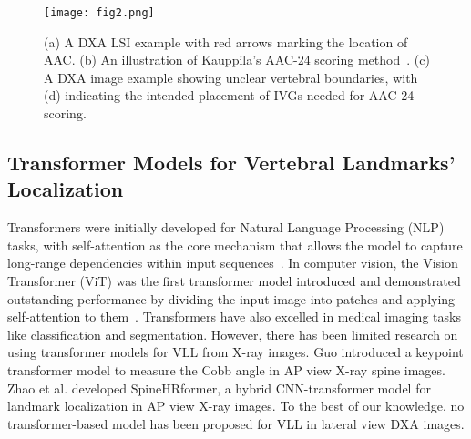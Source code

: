 \begin{figure}[t]
\centerline{\texttt{[image: fig2.png]}}
\caption{(a) A DXA LSI example with red arrows marking the location of AAC. (b) An illustration of Kauppila's AAC-24 scoring method~\cite{kauppila}. (c) A DXA image example showing unclear vertebral boundaries, with (d) indicating the intended placement of IVGs needed for AAC-24 scoring.}
\label{fig2}
\end{figure}

\subsection{Transformer Models for Vertebral Landmarks' Localization}
Transformers were initially developed for Natural Language Processing (NLP) tasks, with self-attention as the core mechanism that allows the model to capture long-range dependencies within input sequences~\cite{attention}. In computer vision, the Vision Transformer (ViT) was the first transformer model introduced and demonstrated outstanding performance by dividing the input image into patches and applying self-attention to them~\cite{vit}. Transformers have also excelled in medical imaging tasks like classification and segmentation. However, there has been limited research on using transformer models for VLL from X-ray images. Guo \cite{guo} introduced a keypoint transformer model to measure the Cobb angle in AP view X-ray spine images. Zhao et al. \cite{moxin} developed SpineHRformer, a hybrid CNN-transformer model for landmark localization in AP view X-ray images. To the best of our knowledge, no transformer-based model has been proposed for VLL in lateral view DXA images. \par